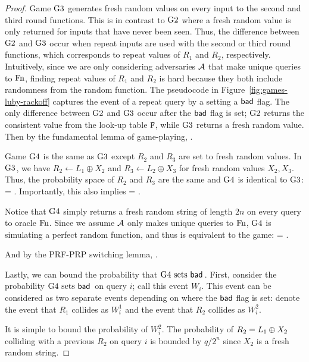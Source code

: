 \begin{proof}
Game ${{\textnormal G}}3$ generates fresh random values on every input to the second and third round functions.
This is in contrast to ${{\textnormal G}}2$ where a fresh random value is only returned for inputs that have never been seen.
Thus, the difference between ${{\textnormal G}}2$ and ${{\textnormal G}}3$ occur when repeat inputs are used with the second or third round functions, which corresponds to repeat values of $R_1$ and $R_2$, respectively.
Intuitively, since we are only considering adversaries ${\mathcal A}$ that make unique queries to $\textnormal{Fn}$, finding repeat values of $R_1$ and $R_2$ is hard because they both include randomness from the random function.
The pseudocode in Figure~\ref{fig:games-luby-rackoff} captures the event of a repeat query by a setting a $\mathsf{bad}$ flag.
The only difference between ${{\textnormal G}}2$ and ${{\textnormal G}}3$ occur after the $\mathsf{bad}$ flag is set; ${{\textnormal G}}2$ returns the consistent value from the look-up table $\mathtt{F}$, while ${{\textnormal G}}3$ returns a fresh random value.
Then by the fundamental lemma of game-playing,
\bnm
{} \le {}.
\enm

Game ${{\textnormal G}}4$ is the same as ${{\textnormal G}}3$ except $R_2$ and $R_3$ are set to fresh random values.
In ${{\textnormal G}}3$, we have $R_2\gets L_1\oplus X_2$ and $R_3\gets L_2\oplus X_3$ for fresh random values $X_2,X_3$.
Thus, the probability space of $R_2$ and $R_3$ are the same and ${{\textnormal G}}4$ is identical to ${{\textnormal G}}3$:
\bnm
{} = .
\enm
Importantly, this also implies
\bnm
{} = .
\enm

Notice that ${{\textnormal G}}4$ simply returns a fresh random string of length $2n$ on every query to oracle $\textnormal{Fn}$.
Since we assume ${\mathcal A}$ only makes unique queries to $\textnormal{Fn}$, ${{\textnormal G}}4$ is simulating a perfect random function, and thus is equivalent to the  game:
\bnm
{} = .
\enm

And by the PRF-PRP switching lemma,
	\bnm
	 \le {}  \;.
	\enm

Lastly, we can bound the probability that ${{\textnormal G}}4\mbox{~\textup{sets} $\mathsf{bad}$}\,$.
First, consider the probability ${{\textnormal G}}4\mbox{~\textup{sets} $\mathsf{bad}$}\,$ on query $i$; call this event $W_i$.
This event can be considered as two separate events depending on where the $\mathsf{bad}$ flag is set:
denote the event that $R_1$ collides as $W_i^1$ and the event that $R_2$ collides as $W_i^2$.

It is simple to bound the probability of $W_i^2$.
The probability of $R_2 = L_1 {\:\oplus\:} X_2$ colliding with a previous $R_2$ on query $i$ is bounded by $q/2^n$ since $X_2$ is a fresh random string. 


\end{proof}
